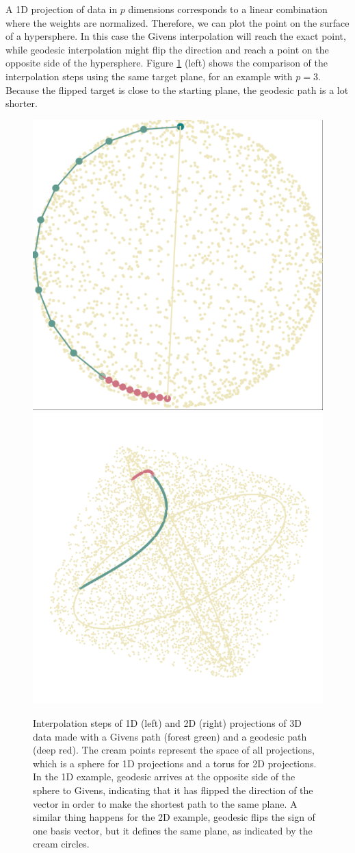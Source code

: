 A 1D projection of data in \(p\) dimensions corresponds to a linear combination where the weights are normalized. Therefore, we can plot the point on the surface of a hypersphere. In this case the Givens interpolation will reach the exact point, while geodesic interpolation might flip the direction and reach a point on the opposite side of the hypersphere. Figure \ref{fig:1d-path-static} (left) shows the comparison of the interpolation steps using the same target plane, for an example with \(p=3\). Because the flipped target is close to the starting plane, the geodesic path is a lot shorter.

\begin{figure}

{\centering \includegraphics[width=0.45\linewidth]{figures/sphere_static} \includegraphics[width=0.45\linewidth]{figures/torus_static} 

}

\caption{Interpolation steps of 1D (left) and 2D (right) projections of 3D data made with a Givens path (forest green) and a geodesic path (deep red). The cream points represent the space of all projections, which is a sphere for 1D projections and a torus for 2D projections. In the 1D example, geodesic arrives at the opposite side of the sphere to Givens, indicating that it has flipped the direction of the vector in order to make the shortest path to the same plane. A similar thing happens for the 2D example, geodesic flips the sign of one basis vector, but it defines the same plane, as indicated by the cream circles.}\label{fig:1d-path-static}
\end{figure}

